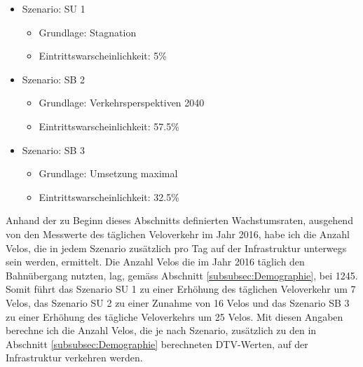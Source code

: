 \begin{itemize}
\item Szenario: SU 1
	\begin{itemize}
	\item Grundlage: Stagnation 
	\item Eintrittswarscheinlichkeit: 5\%
	\end{itemize}
\item Szenario: SB 2
	\begin{itemize}
	\item Grundlage: Verkehrsperspektiven 2040
	\item Eintrittswarscheinlichkeit: 57.5\%
	\end{itemize}
\item Szenario: SB 3
	\begin{itemize}
	\item Grundlage: Umsetzung maximal
	\item Eintrittswarscheinlichkeit: 32.5\%
	\end{itemize}
\end{itemize}

Anhand der zu Beginn dieses Abschnitts definierten Wachstumsraten, ausgehend von den Messwerte des täglichen Veloverkehr im Jahr 2016, habe ich die Anzahl Velos, die in jedem Szenario zusätzlich pro Tag auf der Infrastruktur unterwegs sein werden, ermittelt. Die Anzahl Velos die im Jahr 2016 täglich den Bahnübergang nutzten, lag, gemäss Abschnitt \ref{subsubsec:Demographie}, bei 1245.
Somit führt das Szenario SU 1 zu einer Erhöhung des täglichen Veloverkehr um 7 Velos, das Szenario SU 2 zu einer Zunahme von 16 Velos und das Szenario SB 3 zu einer Erhöhung des tägliche Veloverkehrs um 25 Velos. 
Mit diesen Angaben berechne ich die Anzahl Velos, die je nach Szenario, zusätzlich zu den in Abschnitt \ref{subsubsec:Demographie} berechneten DTV-Werten, auf der Infrastruktur verkehren werden.


%

